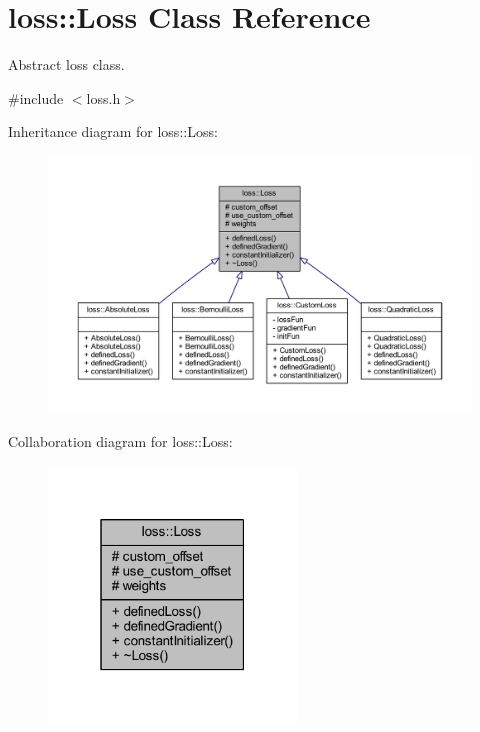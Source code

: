 \hypertarget{classloss_1_1_loss}{}\section{loss\+:\+:Loss Class Reference}
\label{classloss_1_1_loss}


Abstract loss class.  




{\ttfamily \#include $<$loss.\+h$>$}



Inheritance diagram for loss\+:\+:Loss\+:\nopagebreak
\begin{figure}[H]
\begin{center}
\leavevmode
\includegraphics[width=350pt]{classloss_1_1_loss__inherit__graph}
\end{center}
\end{figure}


Collaboration diagram for loss\+:\+:Loss\+:\nopagebreak
\begin{figure}[H]
\begin{center}
\leavevmode
\includegraphics[width=187pt]{classloss_1_1_loss__coll__graph}
\end{center}
\end{figure}

